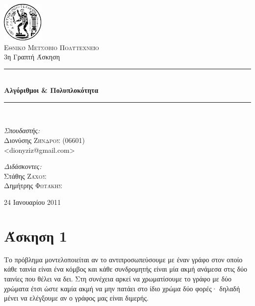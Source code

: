 \documentclass[11pt,a4paper,oneside]{report}
\newcommand{\HRule}{\rule{\linewidth}{0.5mm}}
\begin{document}
\begin{titlepage}
\begin{center}

\includegraphics[width=0.15\textwidth]{Pyrforos3.png}\\[1cm]
\textsc{\LARGE Εθνικό Μετσόβιο Πολυτεχνείο}\\[1.5cm]

\Large{ 3η Γραπτή Άσκηση }\\[0.5cm]

\begin{doublespace}
\HRule \\[0.4cm]
{\huge \bfseries
Αλγόριθμοι \& Πολυπλοκότητα
}\\[0.4cm]
\end{doublespace}

\HRule \\[1.5cm]

\begin{minipage}{0.4\textwidth}
\begin{flushleft} \large
\emph{Σπουδαστής:} \\
Διονύσης \textsc{Ζήνδρος} (06601)\\
\textlatin{\textless dionyziz@gmail.com\textgreater}
\end{flushleft}
\end{minipage}
\begin{minipage}{0.4\textwidth}
\begin{flushright} \large
\emph{Διδάσκοντες:} \\
Στάθης \textsc{Ζάχος}\\
Δημήτρης \textsc{Φωτάκης}
\end{flushright}
\end{minipage}

\vfill

{\large 24 Ιανουαρίου 2011}
\end{center}
\end{titlepage}

\section*{Άσκηση 1}
Το πρόβλημα μοντελοποιείται αν το αντιπροσωπεύσουμε με έναν γράφο στον οποίο κάθε ταινία είναι ένα κόμβος και κάθε συνδρομητής είναι μία ακμή ανάμεσα στις δύο ταινίες που θέλει να δει. Στη συνέχεια αρκεί να χρωματίσουμε το γράφο με δύο χρώματα έτσι ώστε καμία ακμή να μην πατάει στο ίδιο χρώμα δύο φορές· δηλαδή μένει να ελέγξουμε αν ο γράφος μας είναι διμερής.
\end{document}
